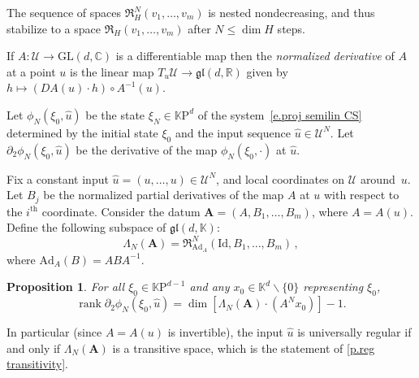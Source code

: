 \documentclass[10pt, a4paper]{amsart}
\theoremstyle{plain}
\newtheorem{prop}[lemma]{Proposition}
\theoremstyle{definition}
\theoremstyle{remark}
\theoremstyle{note}
\numberwithin{equation}{section}
\begin{document}
The sequence of spaces ${\mathfrak{R}}^N_H(v_1,\dots,v_m)$ is nested nondecreasing, and
thus stabilize to a space ${\mathfrak{R}}_H(v_1,\dots,v_m)$ 
after $N \le \dim H$ steps.

\medskip

If $A \colon {\mathcal{U}} \to {\mathrm{GL}}(d,{\mathbb{C}})$ is a differentiable map
then the \emph{normalized derivative} of $A$ at a point $u$
is the linear map $T_u {\mathcal{U}} \to {\mathfrak{gl}}(d,{\mathbb{R}})$
given by 
$h \mapsto (DA(u)\cdot h)\circ A^{-1}(u)$.

Let $\phi_N(\xi_0,\hat{u})$ be the state $\xi_N\in {\mathbb{K}\mathrm{P}}^d$ of the system~\eqref{e.proj semilin CS} 
determined by the initial state $\xi_0$ and the input sequence $\hat{u}\in {\mathcal{U}}^N$. 
Let $\partial_2 \phi_N(\xi_0,\hat{u})$ be the derivative of the map $\phi_N(\xi_0, \cdot)$ at $\hat{u}$.

Fix a constant input $\hat{u}=(u,\ldots, u)\in {\mathcal{U}}^N$, 
and local coordinates on ${\mathcal{U}}$ around~$u$. 
Let $B_j$ be the normalized partial derivatives of the map $A$ at $u$ with respect to the $i^\mathrm{th}$ coordinate. 
Consider the datum ${\mathbf{A}}=(A,B_1,\ldots, B_m)$, where $A = A(u)$.
Define the following subspace of ${\mathfrak{gl}}(d,{\mathbb{K}})$:
\begin{equation}\label{e.Lambda_N}
\Lambda_N({\mathbf{A}}) =  {\mathfrak{R}}_{{\mathrm{Ad}}_A}^N ({\mathrm{Id}}, B_1, \dots, B_m) \, ,
\end{equation}
where ${\mathrm{Ad}}_A(B) = ABA^{-1}$.

\begin{prop}\label{p.ranks}
For all $\xi_0\in {\mathbb{K}\mathrm{P}}^{d-1}$ and any $x_0\in {\mathbb{K}}^d{\smallsetminus} \{0\}$ representing $\xi_0$, 
$$
\operatorname{rank} \partial_2 \phi_N (\xi_0,\hat{u}) = \dim\left[\Lambda_N({\mathbf{A}})\cdot (A^N x_0)\right]-1.
$$
\end{prop}

In particular (since $A =A(u)$ is invertible), 
the input $\hat{u}$ is universally regular 
if and only if $\Lambda_N({\mathbf{A}})$ is a transitive space,
which is the statement of \cref{p.reg transitivity}.
\end{document}
